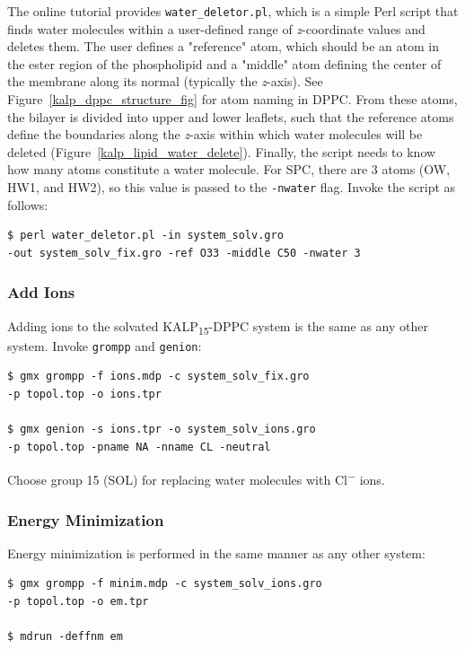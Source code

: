 \documentclass[9pt,tutorial]{livecoms}
\begin{document}
The online tutorial provides \texttt{water\_deletor.pl}, which is a simple Perl script that finds water molecules within a user-defined range of {\em z}-coordinate values and deletes them. The user defines a "reference" atom, which should be an atom in the ester region of the phospholipid and a "middle" atom defining the center of the membrane along its normal (typically the {\em z}-axis). See Figure~\ref{kalp_dppc_structure_fig} for atom naming in DPPC. From these atoms, the bilayer is divided into upper and lower leaflets, such that the reference atoms define the boundaries along the {\em z}-axis within which water molecules will be deleted (Figure~\ref{kalp_lipid_water_delete}). Finally, the script needs to know how many atoms constitute a water molecule. For SPC, there are 3 atoms (OW, HW1, and HW2), so this value is passed to the \texttt{-nwater} flag. Invoke the script as follows:

\begin{verbatim}
$ perl water_deletor.pl -in system_solv.gro 
-out system_solv_fix.gro -ref O33 -middle C50 -nwater 3
\end{verbatim}

\subsubsection{Add Ions} \label{kalp_ions}

Adding ions to the solvated KALP\textsubscript{15}-DPPC system is the same as any other system. Invoke \texttt{grompp} and \texttt{genion}:

\begin{verbatim}
$ gmx grompp -f ions.mdp -c system_solv_fix.gro 
-p topol.top -o ions.tpr

$ gmx genion -s ions.tpr -o system_solv_ions.gro 
-p topol.top -pname NA -nname CL -neutral
\end{verbatim}

Choose group 15 (SOL) for replacing water molecules with Cl\textsuperscript{$-$} ions.

\subsubsection{Energy Minimization} \label{kalp_em}

Energy minimization is performed in the same manner as any other system:

\begin{verbatim}
$ gmx grompp -f minim.mdp -c system_solv_ions.gro
-p topol.top -o em.tpr

$ mdrun -deffnm em
\end{verbatim}
\end{document}
